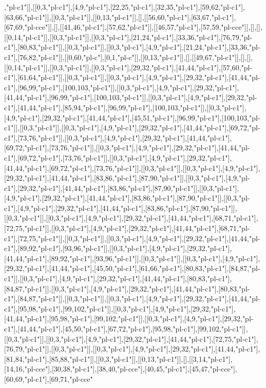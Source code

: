 ,"pl-c1"]],[[0,3,"pl-c1"],[4,9,"pl-c1"],[22,25,"pl-c1"],[32,35,"pl-c1"],[59,62,"pl-c1"],[63,66,"pl-c1"]],[[0,3,"pl-c1"]],[[0,13,"pl-c1"]],[],[[56,60,"pl-c1"],[63,67,"pl-c1"],[67,69,"pl-cce"]],[],[[41,46,"pl-c1"],[57,62,"pl-c1"]],[[46,57,"pl-c1"],[57,59,"pl-cce"]],[],[],[[0,14,"pl-c1"]],[[0,3,"pl-c1"]],[[0,3,"pl-c1"],[21,24,"pl-c1"],[33,36,"pl-c1"],[76,79,"pl-c1"],[80,83,"pl-c1"]],[[0,3,"pl-c1"]],[[0,3,"pl-c1"],[4,9,"pl-c1"],[21,24,"pl-c1"],[33,36,"pl-c1"],[76,82,"pl-c1"]],[[0,60,"pl-c"],[0,1,"pl-c"]],[[0,13,"pl-c1"]],[],[[49,67,"pl-c1"]],[],[],[[0,14,"pl-c1"]],[[0,3,"pl-c1"]],[[0,3,"pl-c1"],[29,32,"pl-c1"],[41,44,"pl-c1"],[57,60,"pl-c1"],[61,64,"pl-c1"]],[[0,3,"pl-c1"]],[[0,3,"pl-c1"],[4,9,"pl-c1"],[29,32,"pl-c1"],[41,44,"pl-c1"],[96,99,"pl-c1"],[100,103,"pl-c1"]],[[0,3,"pl-c1"],[4,9,"pl-c1"],[29,32,"pl-c1"],[41,44,"pl-c1"],[96,99,"pl-c1"],[100,103,"pl-c1"]],[[0,3,"pl-c1"],[4,9,"pl-c1"],[29,32,"pl-c1"],[41,44,"pl-c1"],[85,94,"pl-c1"],[96,99,"pl-c1"],[100,103,"pl-c1"]],[[0,3,"pl-c1"],[4,9,"pl-c1"],[29,32,"pl-c1"],[41,44,"pl-c1"],[45,51,"pl-c1"],[96,99,"pl-c1"],[100,103,"pl-c1"]],[[0,3,"pl-c1"]],[[0,3,"pl-c1"],[4,9,"pl-c1"],[29,32,"pl-c1"],[41,44,"pl-c1"],[69,72,"pl-c1"],[73,76,"pl-c1"]],[[0,3,"pl-c1"],[4,9,"pl-c1"],[29,32,"pl-c1"],[41,44,"pl-c1"],[69,72,"pl-c1"],[73,76,"pl-c1"]],[[0,3,"pl-c1"],[4,9,"pl-c1"],[29,32,"pl-c1"],[41,44,"pl-c1"],[69,72,"pl-c1"],[73,76,"pl-c1"]],[[0,3,"pl-c1"],[4,9,"pl-c1"],[29,32,"pl-c1"],[41,44,"pl-c1"],[69,72,"pl-c1"],[73,76,"pl-c1"]],[[0,3,"pl-c1"]],[[0,3,"pl-c1"],[4,9,"pl-c1"],[29,32,"pl-c1"],[41,44,"pl-c1"],[83,86,"pl-c1"],[87,90,"pl-c1"]],[[0,3,"pl-c1"],[4,9,"pl-c1"],[29,32,"pl-c1"],[41,44,"pl-c1"],[83,86,"pl-c1"],[87,90,"pl-c1"]],[[0,3,"pl-c1"],[4,9,"pl-c1"],[29,32,"pl-c1"],[41,44,"pl-c1"],[83,86,"pl-c1"],[87,90,"pl-c1"]],[[0,3,"pl-c1"],[4,9,"pl-c1"],[29,32,"pl-c1"],[41,44,"pl-c1"],[83,86,"pl-c1"],[87,90,"pl-c1"]],[[0,3,"pl-c1"]],[[0,3,"pl-c1"],[4,9,"pl-c1"],[29,32,"pl-c1"],[41,44,"pl-c1"],[68,71,"pl-c1"],[72,75,"pl-c1"]],[[0,3,"pl-c1"],[4,9,"pl-c1"],[29,32,"pl-c1"],[41,44,"pl-c1"],[68,71,"pl-c1"],[72,75,"pl-c1"]],[[0,3,"pl-c1"]],[[0,3,"pl-c1"],[4,9,"pl-c1"],[29,32,"pl-c1"],[41,44,"pl-c1"],[89,92,"pl-c1"],[93,96,"pl-c1"]],[[0,3,"pl-c1"],[4,9,"pl-c1"],[29,32,"pl-c1"],[41,44,"pl-c1"],[89,92,"pl-c1"],[93,96,"pl-c1"]],[[0,3,"pl-c1"]],[[0,3,"pl-c1"],[4,9,"pl-c1"],[29,32,"pl-c1"],[41,44,"pl-c1"],[45,50,"pl-c1"],[61,66,"pl-c1"],[80,83,"pl-c1"],[84,87,"pl-c1"]],[[0,3,"pl-c1"],[4,9,"pl-c1"],[29,32,"pl-c1"],[41,44,"pl-c1"],[80,83,"pl-c1"],[84,87,"pl-c1"]],[[0,3,"pl-c1"],[4,9,"pl-c1"],[29,32,"pl-c1"],[41,44,"pl-c1"],[80,83,"pl-c1"],[84,87,"pl-c1"]],[[0,3,"pl-c1"]],[[0,3,"pl-c1"],[4,9,"pl-c1"],[29,32,"pl-c1"],[41,44,"pl-c1"],[95,98,"pl-c1"],[99,102,"pl-c1"]],[[0,3,"pl-c1"],[4,9,"pl-c1"],[29,32,"pl-c1"],[41,44,"pl-c1"],[95,98,"pl-c1"],[99,102,"pl-c1"]],[[0,3,"pl-c1"],[4,9,"pl-c1"],[29,32,"pl-c1"],[41,44,"pl-c1"],[45,50,"pl-c1"],[67,72,"pl-c1"],[95,98,"pl-c1"],[99,102,"pl-c1"]],[[0,3,"pl-c1"]],[[0,3,"pl-c1"],[4,9,"pl-c1"],[29,32,"pl-c1"],[41,44,"pl-c1"],[72,75,"pl-c1"],[76,79,"pl-c1"]],[[0,3,"pl-c1"]],[[0,3,"pl-c1"],[4,9,"pl-c1"],[29,32,"pl-c1"],[41,44,"pl-c1"],[81,84,"pl-c1"],[85,88,"pl-c1"]],[[0,3,"pl-c1"]],[[0,13,"pl-c1"]],[],[[3,14,"pl-c1"],[14,16,"pl-cce"],[30,38,"pl-c1"],[38,40,"pl-cce"],[40,45,"pl-c1"],[45,47,"pl-cce"],[60,69,"pl-c1"],[69,71,"pl-cce"